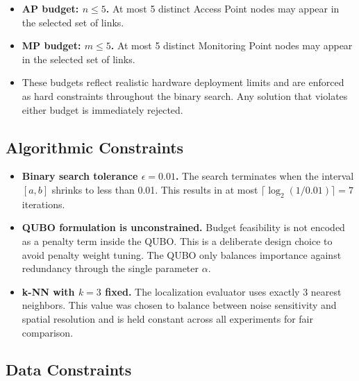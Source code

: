 \documentclass[12pt,a4paper]{article}
\begin{document}
\begin{itemize}[leftmargin=2em]
    \item \textbf{AP budget: $n \leq 5$.} At most 5 distinct Access Point
          nodes may appear in the selected set of links.
    \item \textbf{MP budget: $m \leq 5$.} At most 5 distinct Monitoring
          Point nodes may appear in the selected set of links.
    \item These budgets reflect realistic hardware deployment limits and
          are enforced as hard constraints throughout the binary search.
          Any solution that violates either budget is immediately rejected.
\end{itemize}

\subsection{Algorithmic Constraints}

\begin{itemize}[leftmargin=2em]
    \item \textbf{Binary search tolerance $\epsilon = 0.01$.} The search
          terminates when the interval $[a, b]$ shrinks to less than 0.01.
          This results in at most $\lceil \log_2(1/0.01) \rceil = 7$
          iterations.
    \item \textbf{QUBO formulation is unconstrained.} Budget feasibility
          is not encoded as a penalty term inside the QUBO. This is a
          deliberate design choice to avoid penalty weight tuning. The QUBO
          only balances importance against redundancy through the single
          parameter $\alpha$.
    \item \textbf{k-NN with $k = 3$ fixed.} The localization evaluator uses
          exactly 3 nearest neighbors. This value was chosen to balance
          between noise sensitivity and spatial resolution and is held
          constant across all experiments for fair comparison.
\end{itemize}

\subsection{Data Constraints}
\end{document}
